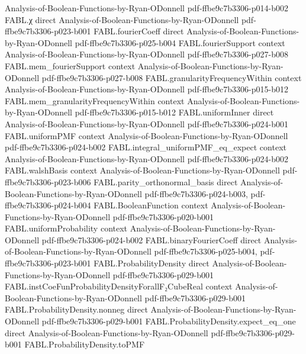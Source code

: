 \begin{theorem}
  {Analysis-of-Boolean-Functions-by-Ryan-ODonnell}
  {pdf-ffbe9c7b3306-p014-b002}
\proofstep
  {FABL.χ}
  {direct}
  {Analysis-of-Boolean-Functions-by-Ryan-ODonnell}
  {pdf-ffbe9c7b3306-p023-b001}
\proofstep
  {FABL.fourierCoeff}
  {direct}
  {Analysis-of-Boolean-Functions-by-Ryan-ODonnell}
  {pdf-ffbe9c7b3306-p025-b004}
\proofstep
  {FABL.fourierSupport}
  {context}
  {Analysis-of-Boolean-Functions-by-Ryan-ODonnell}
  {pdf-ffbe9c7b3306-p027-b008}
\proofstep
  {FABL.mem_fourierSupport}
  {context}
  {Analysis-of-Boolean-Functions-by-Ryan-ODonnell}
  {pdf-ffbe9c7b3306-p027-b008}
\proofstep
  {FABL.granularityFrequencyWithin}
  {context}
  {Analysis-of-Boolean-Functions-by-Ryan-ODonnell}
  {pdf-ffbe9c7b3306-p015-b012}
\proofstep
  {FABL.mem_granularityFrequencyWithin}
  {context}
  {Analysis-of-Boolean-Functions-by-Ryan-ODonnell}
  {pdf-ffbe9c7b3306-p015-b012}
\proofstep
  {FABL.uniformInner}
  {direct}
  {Analysis-of-Boolean-Functions-by-Ryan-ODonnell}
  {pdf-ffbe9c7b3306-p024-b001}
\proofstep
  {FABL.uniformPMF}
  {context}
  {Analysis-of-Boolean-Functions-by-Ryan-ODonnell}
  {pdf-ffbe9c7b3306-p024-b002}
\proofstep
  {FABL.integral_uniformPMF_eq_expect}
  {context}
  {Analysis-of-Boolean-Functions-by-Ryan-ODonnell}
  {pdf-ffbe9c7b3306-p024-b002}
\proofstep
  {FABL.walshBasis}
  {context}
  {Analysis-of-Boolean-Functions-by-Ryan-ODonnell}
  {pdf-ffbe9c7b3306-p023-b006}
\proofstep
  {FABL.parity_orthonormal_basis}
  {direct}
  {Analysis-of-Boolean-Functions-by-Ryan-ODonnell}
  {pdf-ffbe9c7b3306-p024-b003,
    pdf-ffbe9c7b3306-p024-b004}
\proofstep
  {FABL.BooleanFunction}
  {context}
  {Analysis-of-Boolean-Functions-by-Ryan-ODonnell}
  {pdf-ffbe9c7b3306-p020-b001}
\proofstep
  {FABL.uniformProbability}
  {context}
  {Analysis-of-Boolean-Functions-by-Ryan-ODonnell}
  {pdf-ffbe9c7b3306-p024-b002}
\proofstep
  {FABL.binaryFourierCoeff}
  {direct}
  {Analysis-of-Boolean-Functions-by-Ryan-ODonnell}
  {pdf-ffbe9c7b3306-p025-b004,
    pdf-ffbe9c7b3306-p023-b001}
\proofstep
  {FABL.ProbabilityDensity}
  {direct}
  {Analysis-of-Boolean-Functions-by-Ryan-ODonnell}
  {pdf-ffbe9c7b3306-p029-b001}
\proofstep
  {FABL.instCoeFunProbabilityDensityForallF₂CubeReal}
  {context}
  {Analysis-of-Boolean-Functions-by-Ryan-ODonnell}
  {pdf-ffbe9c7b3306-p029-b001}
\proofstep
  {FABL.ProbabilityDensity.nonneg}
  {direct}
  {Analysis-of-Boolean-Functions-by-Ryan-ODonnell}
  {pdf-ffbe9c7b3306-p029-b001}
\proofstep
  {FABL.ProbabilityDensity.expect_eq_one}
  {direct}
  {Analysis-of-Boolean-Functions-by-Ryan-ODonnell}
  {pdf-ffbe9c7b3306-p029-b001}
\proofstep
  {FABL.ProbabilityDensity.toPMF}

\end{theorem}
